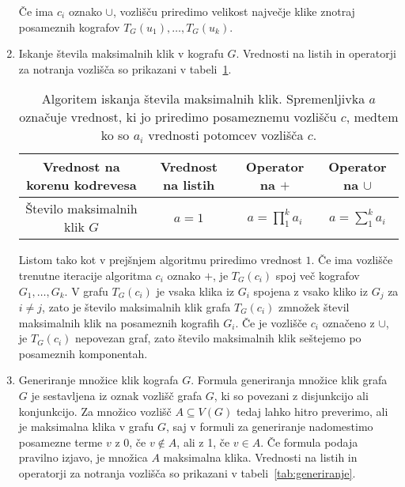\documentclass[12pt,a4paper,twoside]{article}
\theoremstyle{definition} %
\theoremstyle{plain} %
\numberwithin{equation}{section}  %
\begin{document}
\begin{enumerate}[label=($\roman*$)]
Če ima $c_i$ oznako $\cup$, vozlišču priredimo velikost največje klike znotraj posameznih kografov $T_G(u_1), \dots, T_G(u_k)$.



\item Iskanje števila maksimalnih klik v kografu $G$. Vrednosti na listih in operatorji za notranja vozlišča so prikazani v tabeli~\ref{tab:iskanjeStevilaMaxKlik}.

\begin{table}[h!]
\begin{adjustbox}{width=\columnwidth,center}
\begin{tabular}{c|ccc}
Vrednost na korenu kodrevesa & Vrednost na listih   & Operator na $+$   &  Operator na $\cup$  \\ \hline
Število maksimalnih klik $G$ & $a=1$    &   $a=\prod_1^k a_i$   &     $a=\sum_1^k a_i$   
\end{tabular}
\end{adjustbox}
\caption{Algoritem iskanja števila maksimalnih klik. Spremenljivka $a$ označuje vrednost, ki jo priredimo posameznemu vozlišču $c$, medtem ko so $a_i$ vrednosti potomcev vozlišča $c$.}
\label{tab:iskanjeStevilaMaxKlik}
\end{table}

Listom tako kot v prejšnjem algoritmu priredimo vrednost $1$. Če ima vozlišče trenutne iteracije algoritma $c_i$ oznako $+$, je $T_G(c_i)$ spoj več kografov $G_1, \dots, G_k$. V grafu $T_G(c_i)$ je vsaka klika iz $G_i$ spojena z vsako kliko iz $G_j$ za $i \neq j$, zato je število maksimalnih klik grafa $T_G(c_i)$ zmnožek števil maksimalnih klik na posameznih kografih $G_i$. Če je vozlišče $c_i$ označeno z $\cup$, je $T_G(c_i)$ nepovezan graf, zato število maksimalnih klik seštejemo po posameznih komponentah.

\item Generiranje množice klik kografa $G$.
Formula generiranja množice klik grafa $G$ je sestavljena iz oznak vozlišč grafa $G$, ki so povezani z disjunkcijo ali konjunkcijo. Za množico vozlišč $A \subseteq V(G)$ tedaj lahko hitro preverimo, ali je maksimalna klika v grafu $G$, saj v formuli za generiranje nadomestimo posamezne terme $v$ z 0, če $v \notin A$, ali z 1, če $v \in A$. Če formula podaja pravilno izjavo, je množica $A$ maksimalna klika. Vrednosti na listih in operatorji za notranja vozlišča so prikazani v tabeli~\ref{tab:generiranje}.


\end{enumerate}
\end{document}
